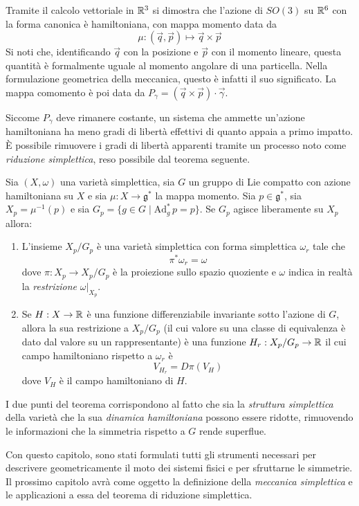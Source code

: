 Tramite il calcolo vettoriale in $\mathbb{R}^3$ si dimostra che l'azione di $SO(3)$ su $\mathbb{R}^6$ con la forma canonica è hamiltoniana, con mappa momento data da 
\begin{equation}
\mu: (\vec{q},\vec{p}) \mapsto \vec{q} \times \vec{p}
\end{equation} 
Si noti che, identificando $\vec{q}$ con la posizione e $\vec{p}$ con il momento lineare, questa quantità è formalmente uguale al momento angolare di una particella. Nella formulazione geometrica della meccanica, questo è infatti il suo significato. La mappa comomento è poi data da $P_{\gamma}=(\vec{q} \times \vec{p}) \cdot  \vec{\gamma}$.

Siccome $P_\gamma$ deve rimanere costante, un sistema che ammette un'azione hamiltoniana ha meno gradi di libertà effettivi di quanto appaia a primo impatto. È possibile rimuovere i gradi di libertà apparenti tramite un processo noto come \emph{riduzione simplettica}, reso possibile dal teorema seguente.

\begin{theorem}
  Sia $(X,\omega)$ una varietà simplettica, sia $G$ un gruppo di Lie compatto con azione hamiltoniana su $X$ e sia $\mu:  X \to \mathfrak{g}^*$ la mappa momento. Sia $p \in \mathfrak{g}^*$, sia $X_p = \mu^{-1}(p)$ e sia $G_p = \{g \in G \mid \mathrm{Ad}_g^*\, p = p\}$. Se $G_p$ agisce liberamente su $X_p$ allora:
  \begin{enumerate}
    \item L'insieme $X_p/G_p$ è una varietà simplettica con forma simplettica $\omega_r$ tale che \begin{equation}
    \pi^* \omega_r = \omega
    \end{equation} 
    dove $\pi:X_p \to X_p/G_p$ è la proiezione sullo spazio quoziente e $\omega$ indica in realtà la \emph{restrizione} $\omega|_{X_p}$.
    \item Se $H:X\to \mathbb{R}$ è una funzione differenziabile invariante sotto l'azione di $G$, allora la sua restrizione a $X_p/G_p$ (il cui valore su una classe di equivalenza è dato dal valore su un rappresentante) è una funzione $H_r:X_p/G_p \to \mathbb{R}$ il cui campo hamiltoniano rispetto a $\omega_r$ è \begin{equation}
    V_{H_r} = D \pi(V_H)
    \end{equation}
    dove $V_H$ è il campo hamiltoniano di $H$.
  \end{enumerate}
\end{theorem}
\begin{remark}
  I due punti del teorema corrispondono al fatto che sia la \emph{struttura simplettica} della varietà che la sua \emph{dinamica hamiltoniana} possono essere ridotte, rimuovendo le informazioni che la simmetria rispetto a $G$ rende superflue.
\end{remark}

Con questo capitolo, sono stati formulati tutti gli strumenti necessari per descrivere geometricamente il moto dei sistemi fisici e per sfruttarne le simmetrie. Il prossimo capitolo avrà come oggetto la definizione della \emph{meccanica simplettica} e le applicazioni a essa del teorema di riduzione simplettica.
